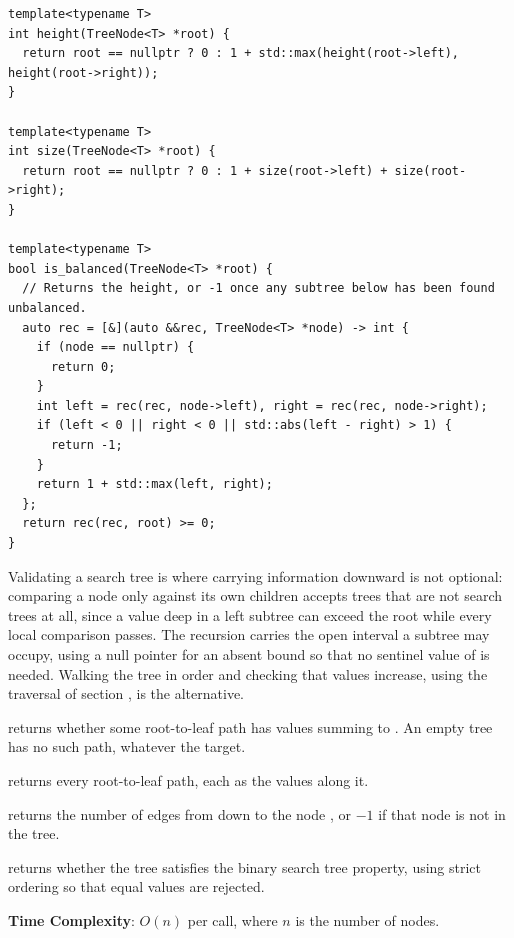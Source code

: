 \begin{lstlisting}[style=cpp]
template<typename T>
int height(TreeNode<T> *root) {
  return root == nullptr ? 0 : 1 + std::max(height(root->left), height(root->right));
}

template<typename T>
int size(TreeNode<T> *root) {
  return root == nullptr ? 0 : 1 + size(root->left) + size(root->right);
}

template<typename T>
bool is_balanced(TreeNode<T> *root) {
  // Returns the height, or -1 once any subtree below has been found unbalanced.
  auto rec = [&](auto &&rec, TreeNode<T> *node) -> int {
    if (node == nullptr) {
      return 0;
    }
    int left = rec(rec, node->left), right = rec(rec, node->right);
    if (left < 0 || right < 0 || std::abs(left - right) > 1) {
      return -1;
    }
    return 1 + std::max(left, right);
  };
  return rec(rec, root) >= 0;
}
\end{lstlisting}
Validating a search tree is where carrying information downward is not optional: comparing a node only against its own children accepts trees that are not search trees at all, since a value deep in a left subtree can exceed the root while every local comparison passes. The recursion carries the open interval a subtree may occupy, using a null pointer for an absent bound so that no sentinel value of  is needed. Walking the tree in order and checking that values increase, using the traversal of section , is the alternative.

\begin{compactitem}
  \item {} returns whether some root-to-leaf path has values summing to . An empty tree has no such path, whatever the target.
  \item {} returns every root-to-leaf path, each as the values along it.
  \item {} returns the number of edges from  down to the node , or $-1$ if that node is not in the tree.
  \item {} returns whether the tree satisfies the binary search tree property, using strict ordering so that equal values are rejected.
\end{compactitem}

\textbf{Time Complexity}: $O(n)$ per call, where $n$ is the number of nodes.

